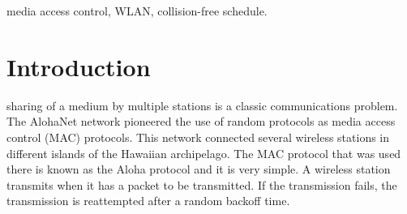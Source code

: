 \documentclass[journal]{IEEEtran}
\begin{document}
\begin{IEEEkeywords}
 media access control, WLAN, collision-free schedule.
\end{IEEEkeywords}






%
\IEEEpeerreviewmaketitle



\section{Introduction}
% 
% 
% 
% 
 sharing of a medium by multiple stations is a classic communications problem. 
The AlohaNet network \cite{abramson2009asw} pioneered the use of random protocols as media access control (MAC) protocols.
This network connected several wireless stations in different islands of the Hawaiian archipelago.
The MAC protocol that was used there is known as the Aloha protocol and it is very simple.
A wireless station transmits when it has a packet to be transmitted. 
If the transmission fails, the transmission is reattempted after a random backoff time.
\end{document}
